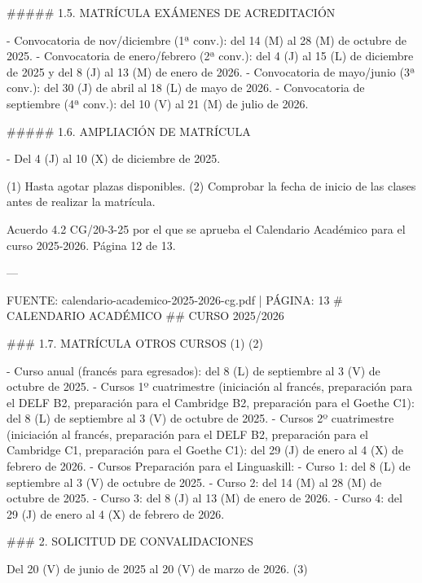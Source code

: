 \documentclass{article}
\begin{document}
\begin{itemize}
\begin{itemize}
\begin{scriptsize}
                  \#\#\#\#\# 1.5. MATRÍCULA EXÁMENES DE ACREDITACIÓN

                  - Convocatoria de nov/diciembre (1ª conv.): del 14 (M) al 28 (M) de octubre de 2025.
                  - Convocatoria de enero/febrero (2ª conv.): del 4 (J) al 15 (L) de diciembre de 2025 y del 8 (J) al 13 (M) de enero de 2026.
                  - Convocatoria de mayo/junio (3ª conv.): del 30 (J) de abril al 18 (L) de mayo de 2026.
                  - Convocatoria de septiembre (4ª conv.): del 10 (V) al 21 (M) de julio de 2026.

                  \#\#\#\#\# 1.6. AMPLIACIÓN DE MATRÍCULA

                  - Del 4 (J) al 10 (X) de diciembre de 2025.

                  (1) Hasta agotar plazas disponibles.
                  (2) Comprobar la fecha de inicio de las clases antes de realizar la matrícula.

                  Acuerdo 4.2 CG/20-3-25 por el que se aprueba el Calendario Académico para el curso 2025-2026. Página 12 de 13.

                  ---

                  FUENTE: calendario-academico-2025-2026-cg.pdf | PÁGINA: 13
                  \# CALENDARIO ACADÉMICO
                  \#\# CURSO 2025/2026

                  \#\#\# 1.7. MATRÍCULA OTROS CURSOS (1) (2)

                  - Curso anual (francés para egresados): del 8 (L) de septiembre al 3 (V) de octubre de 2025.
                  - Cursos 1º cuatrimestre (iniciación al francés, preparación para el DELF B2, preparación para el Cambridge B2, preparación para el Goethe C1): del 8 (L) de septiembre al 3 (V) de octubre de 2025.
                  - Cursos 2º cuatrimestre (iniciación al francés, preparación para el DELF B2, preparación para el Cambridge C1, preparación para el Goethe C1): del 29 (J) de enero al 4 (X) de febrero de 2026.
                  - Cursos Preparación para el Linguaskill:
                  - Curso 1: del 8 (L) de septiembre al 3 (V) de octubre de 2025.
                  - Curso 2: del 14 (M) al 28 (M) de octubre de 2025.
                  - Curso 3: del 8 (J) al 13 (M) de enero de 2026.
                  - Curso 4: del 29 (J) de enero al 4 (X) de febrero de 2026.

                  \#\#\# 2. SOLICITUD DE CONVALIDACIONES

                  Del 20 (V) de junio de 2025 al 20 (V) de marzo de 2026. (3)


\end{scriptsize}
\end{itemize}
\end{itemize}
\end{document}
